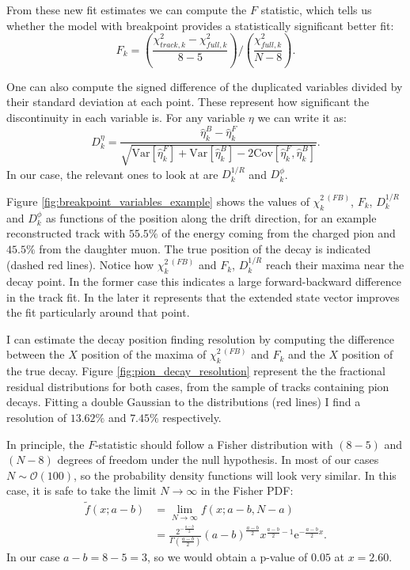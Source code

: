 From these new fit estimates we can compute the $F$ statistic, which tells us whether the model with breakpoint provides a statistically significant better fit:
\begin{equation}
	F_{k}=\left(\frac{\chi^{2}_{track,k}-\chi^{2}_{full,k}}{8-5}\right)/\left(\frac{\chi^{2}_{full,k}}{N-8}\right).
\end{equation}

One can also compute the signed difference of the duplicated variables divided by their standard deviation at each point. These represent how significant the discontinuity in each variable is. For any variable $\eta$ we can write it as:
\begin{equation}
	D^{\eta}_{k} = \frac{\hat{\eta}^{B}_{k}-\hat{\eta}^{F}_{k}}{\sqrt{\mathrm{Var}[\hat{\eta}^{F}_{k}]+\mathrm{Var}[\hat{\eta}^{B}_{k}]-2\mathrm{Cov}[\hat{\eta}^{F}_{k}, \hat{\eta}^{B}_{k}]}}.
\end{equation}
In our case, the relevant ones to look at are $D^{1/R}_{k}$ and $D^{\phi}_{k}$.

Figure \ref{fig:breakpoint_variables_example} shows the values of $\chi^{2 \ (FB)}_{k}$, $F_{k}$, $D^{1/R}_{k}$ and $D^{\phi}_{k}$ as functions of the position along the drift direction, for an example reconstructed track with $55.5\%$ of the energy coming from the charged pion and $45.5\%$ from the daughter muon. The true position of the decay is indicated (dashed red lines). Notice how $\chi^{2 \ (FB)}_{k}$ and $F_{k}$, $D^{1/R}_{k}$ reach their maxima near the decay point. In the former case this indicates a large forward-backward difference in the track fit. In the later it represents that the extended state vector improves the fit particularly around that point.

I can estimate the decay position finding resolution by computing the difference between the $X$ position of the maxima of $\chi^{2 \ (FB)}_{k}$ and $F_{k}$ and the $X$ position of the true decay. Figure \ref{fig:pion_decay_resolution} represent the  the fractional residual distributions for both cases, from the sample of tracks containing pion decays. Fitting a double Gaussian to the distributions (red lines) I find a resolution of $13.62\%$ and $7.45\%$ respectively.

In principle, the $F$-statistic should follow a Fisher distribution with $(8-5)$ and $(N-8)$ degrees of freedom under the null hypothesis. In most of our cases $N\sim\mathcal{O}(100)$, so the probability density functions will look very similar. In this case, it is safe to take the limit $N\rightarrow\infty$ in the Fisher PDF:
\begin{equation}
	\begin{split}
		\tilde{f}(x;a-b)&=\lim_{N \rightarrow \infty} f(x;a-b,N-a)\\
		&= \frac{2^{-\frac{a-b}{2}}}{\Gamma\left(\frac{a-b}{2}\right)}\left(a-b\right)^{\frac{a-b}{2}}x^{\frac{a-b}{2}-1}\mathrm{e}^{-\frac{a-b}{2}x}.
	\end{split}
\end{equation}
In our case $a-b = 8-5 = 3$, so we would obtain a p-value of $0.05$ at $x=2.60$.

